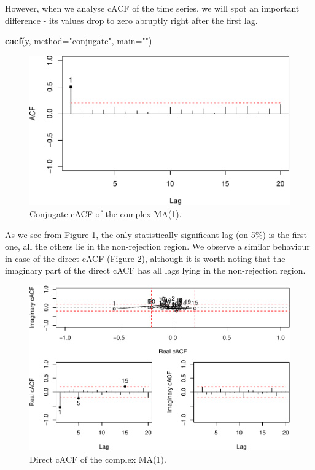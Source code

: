 \documentclass[
]{book}
\newenvironment{Shaded}{\begin{snugshade}}{\end{snugshade}}
\newcommand{\DataTypeTok}[1]{\textcolor[rgb]{0.13,0.29,0.53}{#1}}
\newcommand{\KeywordTok}[1]{\textcolor[rgb]{0.13,0.29,0.53}{\textbf{#1}}}
\newcommand{\NormalTok}[1]{#1}
\newcommand{\StringTok}[1]{\textcolor[rgb]{0.31,0.60,0.02}{#1}}
\begin{document}
However, when we analyse cACF of the time series, we will spot an important difference - its values drop to zero abruptly right after the first lag.

\begin{Shaded}
\begin{Highlighting}[]
\KeywordTok{cacf}\NormalTok{(y, }\DataTypeTok{method=}\StringTok{"conjugate"}\NormalTok{, }\DataTypeTok{main=}\StringTok{""}\NormalTok{)}
\end{Highlighting}
\end{Shaded}

\begin{figure}
\centering
\includegraphics{Svetunkov---Svetunkov---Complex-Valued-Econometrics_files/figure-latex/complexMA1cACF-1.pdf}
\caption{\label{fig:complexMA1cACF}Conjugate cACF of the complex MA(1).}
\end{figure}

As we see from Figure \ref{fig:complexMA1cACF}, the only statistically significant lag (on 5\%) is the first one, all the others lie in the non-rejection region. We observe a similar behaviour in case of the direct cACF (Figure \ref{fig:complexMA1cACFDir}), although it is worth noting that the imaginary part of the direct cACF has all lags lying in the non-rejection region.

\begin{figure}
\centering
\includegraphics{Svetunkov---Svetunkov---Complex-Valued-Econometrics_files/figure-latex/complexMA1cACFDir-1.pdf}
\caption{\label{fig:complexMA1cACFDir}Direct cACF of the complex MA(1).}
\end{figure}
\end{document}
